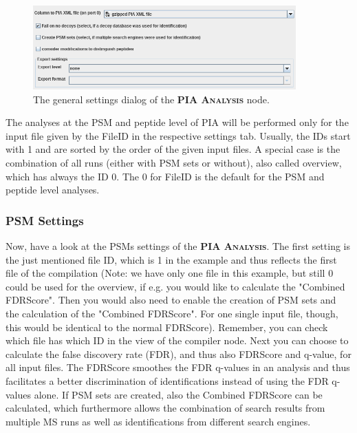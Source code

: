 \documentclass[a4paper,11pt,twoside]{article}
\newcommand{\knimenode}[1]{{\scshape\bfseries #1}}
\begin{document}
\begin{figure}[ht!]
	\centering
	\includegraphics[width=0.9\textwidth]{graphics/pia_settings_general}
	\caption{The general settings dialog of the \knimenode{PIA Analysis} node.}
	\label{pia_settings_general}
\end{figure}

The analyses at the PSM and peptide level of PIA will be performed only for the
input file given by the FileID in the respective settings tab. Usually, the IDs
start with 1 and are sorted by the order of the given input files. A special
case is the combination of all runs (either with PSM sets or without), also
called overview, which has always the ID 0. The 0 for FileID is the default for
the PSM and peptide level analyses.


\subsubsection{PSM Settings}

Now, have a look at the PSMs settings of the \knimenode{PIA Analysis}. The
first setting is the just mentioned file ID, which is 1 in the example and thus
reflects the first file of the compilation (Note: we have only one file in this
example, but still 0 could be used for the overview, if e.g. you would like to
calculate the "Combined FDRScore". Then you would also need to enable the
creation of PSM sets and the calculation of the "Combined FDRScore". For one
single input file, though, this would be identical to the normal FDRScore).
Remember, you can check which file has which ID in the view of the compiler
node. Next you can choose to calculate the false discovery rate (FDR), and thus
also FDRScore and q-value, for all input files. The FDRScore \cite{jones2009}
smoothes the FDR q-values in an analysis and thus facilitates a better
discrimination of identifications instead of using the FDR q-values alone. If
PSM sets are created, also the Combined FDRScore can be calculated, which
furthermore allows the combination of search results from multiple MS runs as
well as identifications from different search engines.
\end{document}
